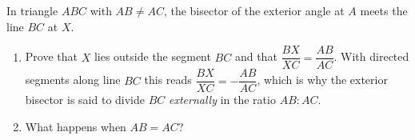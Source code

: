 In triangle $ABC$ with $AB\ne AC$, the bisector of the exterior angle at $A$ meets the line $BC$ at $X$.
\begin{enumerate}
\item[(a)] Prove that $X$ lies outside the segment $BC$ and that $\dfrac{BX}{XC}=\dfrac{AB}{AC}$. With directed segments along line $BC$ this reads $\dfrac{BX}{XC}=-\dfrac{AB}{AC}$, which is why the exterior bisector is said to divide $BC$ \emph{externally} in the ratio $AB:AC$.
\item[(b)] What happens when $AB=AC$?
\end{enumerate}

